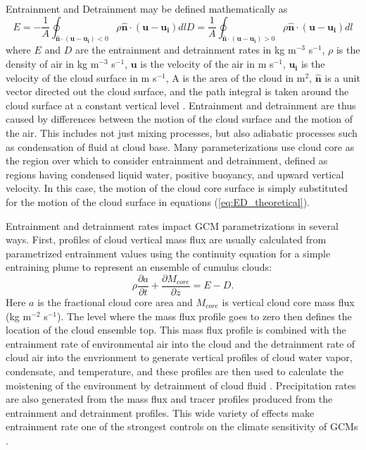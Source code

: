 \documentclass[12pt]{article}
\begin{document}
Entrainment and Detrainment may be defined mathematically as
\begin{subequations}
 \label{eq:ED_theoretical}
\begin{equation}
E = -\frac{1}{A}\oint_{\mathbf{\hat{n}}\cdot(\mathbf{u} - \mathbf{u_i}) < 0}
\rho\mathbf{\hat{n}}\cdot(\mathbf{u}-\mathbf{u_i})dl
\end{equation}
\begin{equation}
D = \frac{1}{A}\oint_{\mathbf{\hat{n}}\cdot(\mathbf{u} - \mathbf{u_i}) > 0}
\rho\mathbf{\hat{n}}\cdot(\mathbf{u}-\mathbf{u_i})dl
\end{equation}
\end{subequations}
where $E$ and $D$ are the entrainment and detrainment rates in kg m$^{-3}$ 
s$^{-1}$, $\rho$ is the density of air in kg m$^{-3}$ s$^{-1}$, $\mathbf{u}$ is 
the velocity of the air in m s$^{-1}$, $\mathbf{u_i}$ is the velocity of the 
cloud surface in m s$^{-1}$, A is the area of the cloud in m$^2$, 
$\mathbf{\hat{n}}$ is a unit vector directed out the cloud surface, and the 
path integral is taken around the cloud surface at a constant vertical level 
\citep{Siebesma1998}.  Entrainment and detrainment are thus caused by 
differences between the motion of the cloud surface and the motion of the air.  
This includes not just mixing processes, but also adiabatic processes such as 
condensation of fluid at cloud base.  Many parameterizations use cloud core as 
the region over which to consider entrainment and detrainment, defined as
regions having condensed liquid water, positive buoyancy, and upward vertical
velocity.  In this case, the motion of the cloud core surface is simply 
substituted for the motion of the cloud surface in equations 
(\ref{eq:ED_theoretical}).

Entrainment and detrainment rates impact GCM parametrizations in several ways.
First, profiles of cloud vertical mass flux are usually calculated from 
parametrized entrainment values using the continuity equation for a 
simple entraining plume to represent an ensemble of cumulus clouds:
\begin{equation}
   \label{eq:continuity}
   \rho \frac{\partial a}{\partial t} 
   + \frac{\partial M_{core}}{\partial z} = E - D.
\end{equation}
Here $a$ is the fractional cloud core area  and $M_{core}$ is vertical cloud 
core mass flux (kg m$^{-2}$ s$^{-1}$). The level where the mass flux profile 
goes to zero then defines the location of the cloud ensemble top.  This mass 
flux profile is combined with the entrainment rate of environmental air into 
the cloud and the detrainment rate of cloud air into the envrionment to 
generate vertical profiles of cloud water vapor, condensate, and 
temperature, and these profiles are then used to calculate the moistening 
of the environment by detrainment of cloud fluid 
\citep{Tiedtke1989, Kain1990}.  Precipitation rates are also generated from the
mass flux and tracer profiles produced from the entrainment and detrainment
profiles.  This wide variety of effects make entrainment rate one of the 
strongest controls on the climate sensitivity of GCMs 
\citep{Stainforth2005, Rougier2009}.
\end{document}
